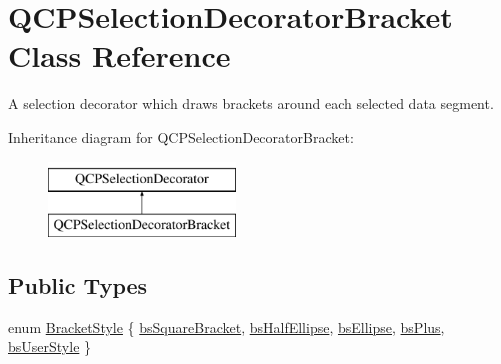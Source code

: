 \hypertarget{class_q_c_p_selection_decorator_bracket}{}\section{Q\+C\+P\+Selection\+Decorator\+Bracket Class Reference}
\label{class_q_c_p_selection_decorator_bracket}


A selection decorator which draws brackets around each selected data segment.  


Inheritance diagram for Q\+C\+P\+Selection\+Decorator\+Bracket\+:\begin{figure}[H]
\begin{center}
\leavevmode
\includegraphics[height=2.000000cm]{class_q_c_p_selection_decorator_bracket}
\end{center}
\end{figure}
\subsection*{Public Types}
\begin{DoxyCompactItemize}
\item 
enum \mbox{\hyperlink{class_q_c_p_selection_decorator_bracket_aa6d18517ec0553575bbef0de4252336e}{Bracket\+Style}} \{ \newline
\mbox{\hyperlink{class_q_c_p_selection_decorator_bracket_aa6d18517ec0553575bbef0de4252336eaa10a8d25d409b09256a13220a4d74f81}{bs\+Square\+Bracket}}, 
\mbox{\hyperlink{class_q_c_p_selection_decorator_bracket_aa6d18517ec0553575bbef0de4252336eafa8ad19b1822c9c03fbe5e9ff8eeeea2}{bs\+Half\+Ellipse}}, 
\mbox{\hyperlink{class_q_c_p_selection_decorator_bracket_aa6d18517ec0553575bbef0de4252336ea7cab0f2f406e293094a7a1e4903f6e8c}{bs\+Ellipse}}, 
\mbox{\hyperlink{class_q_c_p_selection_decorator_bracket_aa6d18517ec0553575bbef0de4252336ea86eb6ae27e6296576fdc46d13c840530}{bs\+Plus}}, 
\newline
\mbox{\hyperlink{class_q_c_p_selection_decorator_bracket_aa6d18517ec0553575bbef0de4252336ea5a627cacdaa30ce434371d6a034b991d}{bs\+User\+Style}}
 \}
\end{DoxyCompactItemize}
